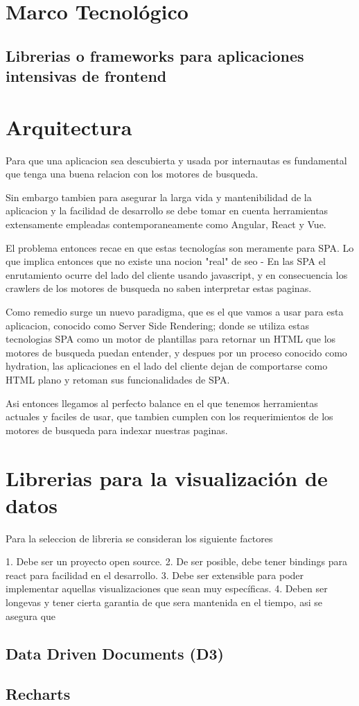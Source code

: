 \section{Marco Tecnológico}

\subsection{Librerias o frameworks para aplicaciones intensivas de frontend }

\section{Arquitectura}

Para que una aplicacion sea descubierta y usada por internautas es fundamental que tenga una buena relacion con los motores de busqueda.

Sin embargo tambien para asegurar la larga vida y mantenibilidad de la aplicacion y la facilidad de desarrollo se debe tomar en cuenta herramientas extensamente empleadas contemporaneamente como Angular, React y Vue.

El problema entonces recae en que estas tecnologías son meramente para SPA. Lo que implica entonces que no existe una nocion "real" de seo - En las SPA el enrutamiento ocurre del lado del cliente usando javascript, y en consecuencia los crawlers de los motores de busqueda no saben interpretar estas paginas.

Como remedio surge un nuevo paradigma, que es el que vamos a usar para esta aplicacion, conocido como Server Side Rendering; donde se utiliza estas tecnologias SPA como un motor de plantillas para retornar un HTML que los motores de busqueda puedan entender, y despues por un proceso conocido como hydration, las aplicaciones en el lado del cliente dejan de comportarse como HTML plano y retoman sus funcionalidades de SPA.

Asi entonces llegamos al perfecto balance en el que tenemos herramientas actuales y faciles de usar, que tambien cumplen con los requerimientos de los motores de busqueda para indexar nuestras paginas.

\section{Librerias para la visualización de datos}

Para la seleccion de libreria se consideran los siguiente factores

1. Debe ser un proyecto open source.
2. De ser posible, debe tener bindings para react para facilidad en el desarrollo.
3. Debe ser extensible para poder implementar aquellas visualizaciones que sean muy específicas.
4. Deben ser longevas y tener cierta garantia de que sera mantenida en el tiempo, asi se asegura que 

\subsection{ Data Driven Documents (D3) }

\subsection{ Recharts }

\subsection{  }

